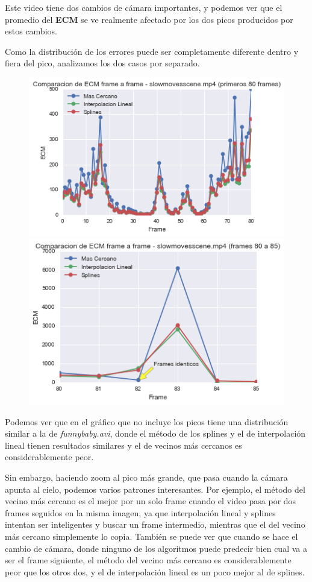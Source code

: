 Este video tiene dos cambios de c\'amara importantes, y podemos ver que el
promedio del \textbf{ECM} se ve realmente afectado por los dos picos producidos
por estos cambios.

Como la distribuci\'on de los errores puede ser completamente diferente dentro y
fiera del pico, analizamos los dos casos por separado.

\begin{figure}[H]
\centering
\includegraphics[width=.49\textwidth]{graficos/ecm_frame_slowmovescene_0_80.png}
\includegraphics[width=.49\textwidth]{graficos/ecm_frame_slowmovescene_80_85.png}
\end{figure}

Podemos ver que en el gr\'afico que no incluye los picos tiene una
distribuci\'on similar a la de \textit{funnybaby.avi}, donde el m\'etodo de los
splines y el de interpolaci\'on lineal tienen resultados similares y el de
vecinos m\'as cercanos es considerablemente peor.

Sin embargo, haciendo zoom al pico m\'as grande, que pasa cuando la c\'amara
apunta al cielo, podemos varios patrones interesantes. Por ejemplo, el m\'etodo del
vecino m\'as cercano es el mejor por un solo frame cuando el video pasa por dos
frames seguidos en la misma imagen, ya que interpolaci\'on lineal y splines
intentan ser inteligentes y buscar un frame intermedio, mientras que el del
vecino m\'as cercano simplemente lo copia. Tambi\'en se puede ver que cuando se
hace el cambio de c\'amara, donde ninguno de los algoritmos puede predecir bien
cual va a ser el frame siguiente, el m\'etodo del vecino m\'as cercano es
considerablemente peor que los otros dos, y el de interpolaci\'on lineal es un
poco mejor al de splines.

